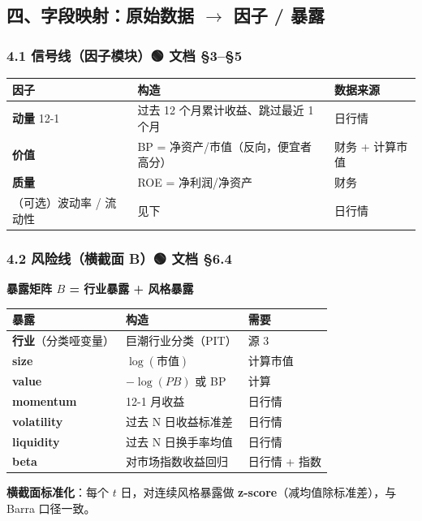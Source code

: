\documentclass[11pt]{article}
\begin{document}
\subsection{\texorpdfstring{四、字段映射：原始数据 \ensuremath{\rightarrow} 因子 / 暴露}{四、字段映射：原始数据 → 因子 / 暴露}}
\subsubsection{\texorpdfstring{4.1 信号线（因子模块）🟢 文档 \S{}3--\S{}5}{4.1 信号线（因子模块）🟢 文档 §3–§5}}
{\small
\begin{longtable}{p{4.97cm}p{7.99cm}p{3.24cm}}
\toprule
因子 & 构造 & 数据来源 \\
\midrule
\textbf{动量} 12-1 & 过去 12 个月累计收益、跳过最近 1 个月 & 日行情 \\
\textbf{价值} & BP = 净资产/市值（反向，便宜者高分） & 财务 + 计算市值 \\
\textbf{质量} & ROE = 净利润/净资产 & 财务 \\
（可选）波动率 / 流动性 & 见下 & 日行情 \\
\bottomrule
\end{longtable}
}
\subsubsection{\texorpdfstring{4.2 风险线（横截面 B）🟢 文档 \S{}6.4}{4.2 风险线（横截面 B）🟢 文档 §6.4}}
\textbf{暴露矩阵 $B$ = 行业暴露 + 风格暴露}
{\small
\begin{longtable}{p{6.60cm}p{5.70cm}p{3.90cm}}
\toprule
暴露 & 构造 & 需要 \\
\midrule
\textbf{行业}（分类哑变量） & 巨潮行业分类（PIT） & 源 3 \\
\textbf{size} & $\log(\text{市值})$ & 计算市值 \\
\textbf{value} & $-\log(PB)$ 或 BP & 计算 \\
\textbf{momentum} & 12-1 月收益 & 日行情 \\
\textbf{volatility} & 过去 N 日收益标准差 & 日行情 \\
\textbf{liquidity} & 过去 N 日换手率均值 & 日行情 \\
\textbf{beta} & 对市场指数收益回归 & 日行情 + 指数 \\
\bottomrule
\end{longtable}
}
\textbf{横截面标准化}：每个 $t$ 日，对连续风格暴露做 \textbf{z-score}（减均值除标准差），与 Barra 口径一致。
\end{document}
